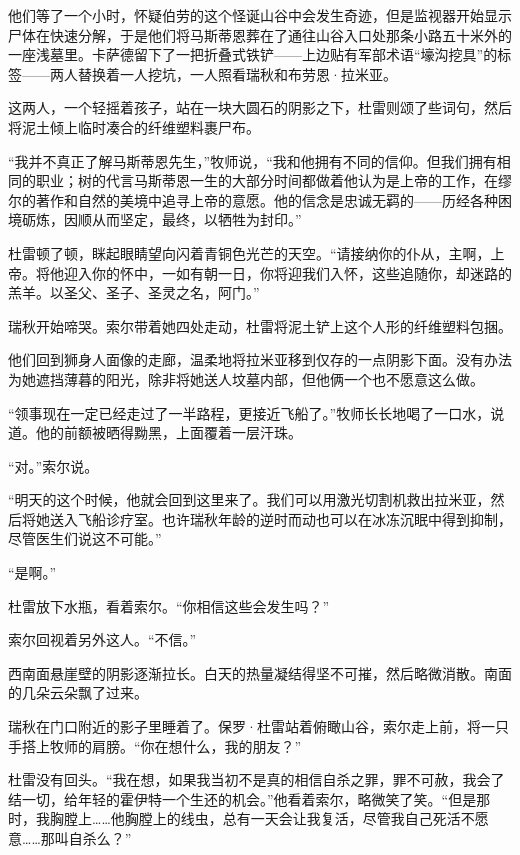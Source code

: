 \documentclass[AutoFakeBold=true]{book}
\begin{document}
\vspace*{1em}

他们等了一个小时，怀疑伯劳的这个怪诞山谷中会发生奇迹，但是监视器开始显示尸体在快速分解，于是他们将马斯蒂恩葬在了通往山谷入口处那条小路五十米外的一座浅墓里。卡萨德留下了一把折叠式铁铲——上边贴有军部术语``壕沟挖具''的标签——两人替换着一人挖坑，一人照看瑞秋和布劳恩·拉米亚。

这两人，一个轻摇着孩子，站在一块大圆石的阴影之下，杜雷则颂了些词句，然后将泥土倾上临时凑合的纤维塑料裹尸布。

``我并不真正了解马斯蒂恩先生，''牧师说，``我和他拥有不同的信仰。但我们拥有相同的职业；树的代言马斯蒂恩一生的大部分时间都做着他认为是上帝的工作，在缪尔的著作和自然的美境中追寻上帝的意愿。他的信念是忠诚无羁的——历经各种困境砺炼，因顺从而坚定，最终，以牺牲为封印。''

杜雷顿了顿，眯起眼睛望向闪着青铜色光芒的天空。``请接纳你的仆从，主啊，上帝。将他迎入你的怀中，一如有朝一日，你将迎我们入怀，这些追随你，却迷路的羔羊。以圣父、圣子、圣灵之名，阿门。''

瑞秋开始啼哭。索尔带着她四处走动，杜雷将泥土铲上这个人形的纤维塑料包捆。

他们回到狮身人面像的走廊，温柔地将拉米亚移到仅存的一点阴影下面。没有办法为她遮挡薄暮的阳光，除非将她送人坟墓内部，但他俩一个也不愿意这么做。

``领事现在一定已经走过了一半路程，更接近飞船了。''牧师长长地喝了一口水，说道。他的前额被晒得黝黑，上面覆着一层汗珠。

``对。''索尔说。

``明天的这个时候，他就会回到这里来了。我们可以用激光切割机救出拉米亚，然后将她送入飞船诊疗室。也许瑞秋年龄的逆时而动也可以在冰冻沉眠中得到抑制，尽管医生们说这不可能。''

``是啊。''

杜雷放下水瓶，看着索尔。``你相信这些会发生吗？''

索尔回视着另外这人。``不信。''

\vspace*{1em}

西南面悬崖壁的阴影逐渐拉长。白天的热量凝结得坚不可摧，然后略微消散。南面的几朵云朵飘了过来。

瑞秋在门口附近的影子里睡着了。保罗·杜雷站着俯瞰山谷，索尔走上前，将一只手搭上牧师的肩膀。``你在想什么，我的朋友？''

杜雷没有回头。``我在想，如果我当初不是真的相信自杀之罪，罪不可赦，我会了结一切，给年轻的霍伊特一个生还的机会。''他看着索尔，略微笑了笑。``但是那时，我胸膛上……他胸膛上的线虫，总有一天会让我复活，尽管我自己死活不愿意……那叫自杀么？''
\end{document}
